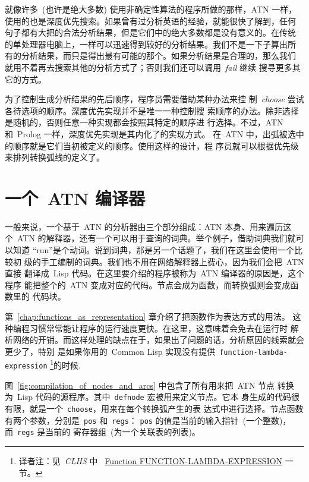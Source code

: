 就像许多~(也许是绝大多数) 使用非确定性算法的程序所做的那样，\textsc{ATN} 一样，
使用的也是深度优先搜索。如果曾有过分析英语的经验，就能很快了解到，任何
句子都有大把的合法分析结果，但是它们中的绝大多数都是没有意义的。在传统
的单处理器电脑上，一样可以迅速得到较好的分析结果。我们不是一下子算出所
有的分析结果，而只是得出最有可能的那个。如果分析结果是合理的，那么我们
就用不着再去搜索其他的分析方式了；否则我们还可以调用~\emph{fail} 继续
搜寻更多其它的方式。

为了控制生成分析结果的先后顺序，程序员需要借助某种办法来控
制~\emph{choose} 尝试各待选项的顺序。深度优先实现并不是唯一一种控制搜
索顺序的办法。除非选择是随机的，否则任意一种实现都会按照其特定的顺序进
行选择。不过，\textsc{ATN} 和~Prolog 一样，深度优先实现是其内化了的实现方式。
在~\textsc{ATN} 中，出弧被选中的顺序就是它们当初被定义的顺序。使用这样的设计，程
序员就可以根据优先级来排列转换弧线的定义了。

\section{一个~\textsc{ATN} 编译器}
\label{sec:an_atn_compiler}
一般来说，一个基于~\textsc{ATN} 的分析器由三个部分组成：\textsc{ATN} 本身、用来遍历这个~\textsc{ATN}
的解释器，还有一个可以用于查询的词典。举个例子，借助词典我们就可以知道
``run''是个动词。说到词典，那是另一个话题了，我们在这里会使用一个比较初
级的手工编制的词典。我们也不用在网络解释器上费心，因为我们会把~\textsc{ATN} 直接
翻译成~Lisp 代码。在这里要介绍的程序被称为~\textsc{ATN} 编译器的原因是，这个程序
能把整个的~\textsc{ATN} 变成对应的代码。节点会成为函数，而转换弧则会变成函数里的
代码块。

第~\ref{chap:functions_as_representation} 章介绍了把函数作为表达方式的用法。
这种编程习惯常常能让程序的运行速度更快。在这里，这意味着会免去在运行时
解析网络的开销。而这样处理的缺点在于，如果出了问题的话，分析原因的线索就会更少了，特别
是如果你用的~Common Lisp 实现没有提供~\texttt{function-lambda-expression} 
\footnote{译者注：见~\emph{CLHS} 中 ~\href{http://www.lisp.org/HyperSpec/Body/fun_function-_a-expression.html}{Function
    FUNCTION-LAMBDA-EXPRESSION} 一节。}的时候.

图~\ref{fig:compilation_of_nodes_and_arcs} 中包含了所有用来把~\textsc{ATN} 节点
转换为~Lisp 代码的源程序。其中~\texttt{defnode} 宏被用来定义节点。它本
身生成的代码很有限，就是一个~\texttt{choose}，用来在每个转换弧产生的表
达式中进行选择。节点函数有两个参数，分别是~\texttt{pos} 和~\texttt{regs}：
\texttt{pos} 的值是当前的输入指针~(一个整数)，而~\texttt{regs} 是当前的
寄存器组~(为一个关联表的列表)。

